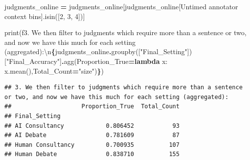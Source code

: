 \documentclass[
]{article}
\newenvironment{Shaded}{\begin{snugshade}}{\end{snugshade}}
\newcommand{\BuiltInTok}[1]{#1}
\newcommand{\CharTok}[1]{\textcolor[rgb]{0.31,0.60,0.02}{#1}}
\newcommand{\KeywordTok}[1]{\textcolor[rgb]{0.13,0.29,0.53}{\textbf{#1}}}
\newcommand{\NormalTok}[1]{#1}
\newcommand{\OperatorTok}[1]{\textcolor[rgb]{0.81,0.36,0.00}{\textbf{#1}}}
\newcommand{\SpecialCharTok}[1]{\textcolor[rgb]{0.81,0.36,0.00}{\textbf{#1}}}
\newcommand{\SpecialStringTok}[1]{\textcolor[rgb]{0.31,0.60,0.02}{#1}}
\newcommand{\StringTok}[1]{\textcolor[rgb]{0.31,0.60,0.02}{#1}}
\begin{document}
\begin{Shaded}
\begin{Highlighting}[]
\NormalTok{judgments\_online }\OperatorTok{=}\NormalTok{ judgments\_online[judgments\_online[}\StringTok{\textquotesingle{}Untimed annotator context bins\textquotesingle{}}\NormalTok{].isin([}\StringTok{\textquotesingle{}2\textquotesingle{}}\NormalTok{, }\StringTok{\textquotesingle{}3\textquotesingle{}}\NormalTok{, }\StringTok{\textquotesingle{}4\textquotesingle{}}\NormalTok{])]}

\BuiltInTok{print}\NormalTok{(}\SpecialStringTok{f\textquotesingle{}3. We then filter to judgments which require more than a sentence or two, and now we have this much for each setting (aggregated):}\CharTok{\textbackslash{}n}\SpecialCharTok{\{}\NormalTok{judgments\_online}\SpecialCharTok{.}\NormalTok{groupby([}\StringTok{"Final\_Setting"}\NormalTok{])[}\StringTok{"Final\_Accuracy"}\NormalTok{]}\SpecialCharTok{.}\NormalTok{agg(Proportion\_True}\OperatorTok{=}\KeywordTok{lambda}\NormalTok{ x: x.mean(),Total\_Count}\OperatorTok{=}\StringTok{"size"}\NormalTok{)}\SpecialCharTok{\}}\SpecialStringTok{\textquotesingle{}}\NormalTok{)}
\end{Highlighting}
\end{Shaded}

\begin{verbatim}
## 3. We then filter to judgments which require more than a sentence or two, and now we have this much for each setting (aggregated):
##                    Proportion_True  Total_Count
## Final_Setting                                  
## AI Consultancy            0.806452           93
## AI Debate                 0.781609           87
## Human Consultancy         0.700935          107
## Human Debate              0.838710          155
\end{verbatim}
\end{document}
